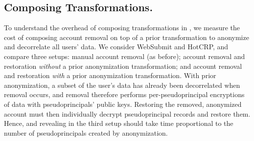 %
%
%

\subsection{Composing \Xxing Transformations.}
\label{s:eval-composition}

%
To understand the overhead of composing transformations in \sys,
we measure the cost of composing account removal on top of
a prior \xxing transformation to anonymize and decorrelate all users' data.
%
We consider WebSubmit and HotCRP, and compare three setups: \one{} manual
account removal (as before); \two{} account removal and restoration
\emph{without} a prior anonymization \xxing transformation; and \three{} account
removal and restoration \emph{with} a prior anonymization \xxing transformation.
%
With prior anonymization, a subset of the user's data has already been decorrelated
when removal occurs, and removal therefore performs per-pseudoprincipal encryptions of
\xxed data with pseudoprincipals' public keys.
%
%
Restoring the removed, anonymized account must then individually decrypt
pseudoprincipal records and restore them.
%
Hence, \xxing and revealing in the third setup should take time proportional to
the number of pseudoprincipals created by anonymization.
%

